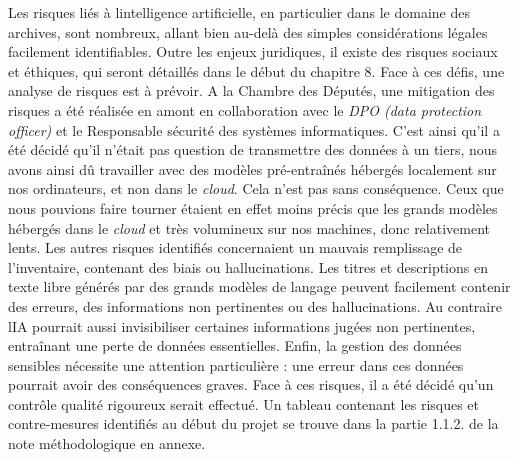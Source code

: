 Les risques liés à l\textquotesingle intelligence artificielle, en
particulier dans le domaine des archives, sont nombreux, allant bien
au-delà des simples considérations légales facilement identifiables.
Outre les enjeux juridiques, il existe des risques sociaux et
éthiques, qui seront détaillés dans le début du chapitre 8. Face à ces défis,
une analyse de risques est à prévoir. A la Chambre des Députés, une
mitigation des risques a été réalisée en amont en collaboration avec le
\emph{DPO (data protection officer)} et le Responsable sécurité des
systèmes informatiques. C'est ainsi qu'il a été décidé qu'il n'était pas
question de transmettre des données à un tiers, nous avons ainsi dû
travailler avec des modèles pré-entraînés hébergés localement sur nos
ordinateurs, et non dans le \emph{cloud}. Cela n'est pas sans conséquence. Ceux
que nous pouvions faire tourner étaient en effet moins précis que les
grands modèles hébergés dans le \emph{cloud} et très volumineux sur nos
machines, donc relativement lents. Les autres risques identifiés
concernaient un mauvais remplissage de l'inventaire, contenant des biais
ou \gls{hallucination}s. Les titres et descriptions en texte libre générés par
des grands modèles de langage peuvent facilement contenir des
erreurs, des informations non pertinentes ou des hallucinations. Au
contraire l\textquotesingle IA pourrait aussi invisibiliser certaines
informations jugées non pertinentes, entraînant une perte de données
essentielles. Enfin, la gestion des données sensibles nécessite une
attention particulière : une erreur dans ces données pourrait avoir des
conséquences graves. Face à ces risques, il a été décidé qu'un contrôle
qualité rigoureux serait effectué. 
Un tableau contenant les risques et contre-mesures identifiés au début du projet se trouve dans la partie 1.1.2. de la note méthodologique en annexe.\newline

